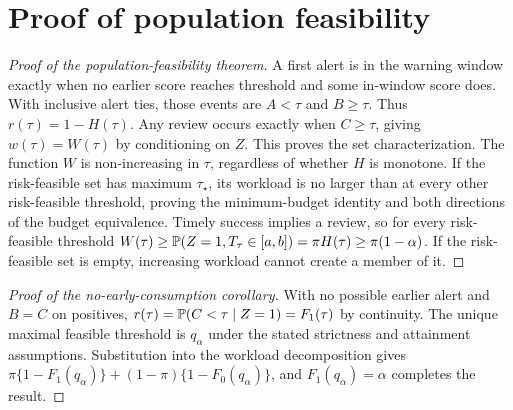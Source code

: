 \section*{Proof of population feasibility}
\begin{proof}[Proof of the population-feasibility theorem]
A first alert is in the warning window exactly when no earlier score reaches threshold and some in-window score does. With inclusive alert ties, those events are $A<\tau$ and $B\ge\tau$. Thus $r(\tau)=1-H(\tau)$. Any review occurs exactly when $C\ge\tau$, giving $w(\tau)=W(\tau)$ by conditioning on $Z$. This proves the set characterization. The function $W$ is non-increasing in $\tau$, regardless of whether $H$ is monotone. If the risk-feasible set has maximum $\tau_\star$, its workload is no larger than at every other risk-feasible threshold, proving the minimum-budget identity and both directions of the budget equivalence. Timely success implies a review, so for every risk-feasible threshold $W(\tau)\ge\mathbb P(Z=1,T_\tau\in[a,b])=\pi H(\tau)\ge\pi(1-\alpha)$. If the risk-feasible set is empty, increasing workload cannot create a member of it.
\end{proof}
\begin{proof}[Proof of the no-early-consumption corollary]
With no possible earlier alert and $B=C$ on positives, $r(\tau)=\mathbb P(C<\tau\mid Z=1)=F_1(\tau)$ by continuity. The unique maximal feasible threshold is $q_\alpha$ under the stated strictness and attainment assumptions. Substitution into the workload decomposition gives $\pi\{1-F_1(q_\alpha)\}+(1-\pi)\{1-F_0(q_\alpha)\}$, and $F_1(q_\alpha)=\alpha$ completes the result.
\end{proof}

